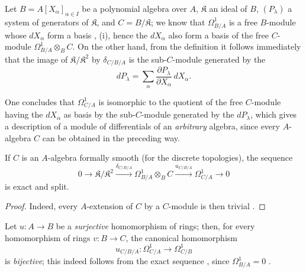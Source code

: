 \begin{example}[20.5.13]
\label{0.20.5.13}
Let $B=A[X_\alpha]_{\alpha\in I}$ be a polynomial algebra over $A$, $\mathfrak{K}$ an ideal of $B$, $(P_\lambda)$ a system of generators of $\mathfrak{K}$, and $C=B/\mathfrak{K}$; we know that $\Omega^1_{B/A}$ is a free $B$-module whose $dX_\alpha$ form a basis , (i), hence the $dX_\alpha$ also form a basis of the free $C$-module $\Omega^1_{B/A}\otimes_B C$.
On the other hand, from the definition it follows immediately that the image of $\mathfrak{K}/\mathfrak{K}^2$ by $\delta_{C/B/A}$ is the sub-$C$-module generated by the
\[
  dP_\lambda=\sum_\alpha\frac{\partial P_\lambda}{\partial X_\alpha}\,dX_\alpha.
\]

One concludes that $\Omega^1_{C/A}$ is isomorphic to the quotient of the free $C$-module having the $dX_\alpha$ as basis by the sub-$C$-module generated by the $dP_\lambda$, which gives a description of a module of differentials of an \emph{arbitrary} algebra, since every $A$-algebra $C$ can be obtained in the preceding way.
\end{example}

\begin{corollary}[20.5.14]
\label{0.20.5.14}
If $C$ is an $A$-algebra formally smooth \textup{(}for the discrete topologies\textup{)}, the sequence
\begin{equation}
\tag{20.5.14.1}
  \label{0.20.5.14.1}
  0\to\mathfrak{K}/\mathfrak{K}^2\xrightarrow{\delta_{C/B/A}}\Omega^1_{B/A}\otimes_B C\xrightarrow{u_{C/B/A}}\Omega^1_{C/A}\to 0
\end{equation}
is exact and split.
\end{corollary}

\begin{proof}
Indeed, every $A$-extension of $C$ by a $C$-module is then trivial .
\end{proof}

\begin{remark}[20.5.15]
\label{0.20.5.15}
Let $u:A\to B$ be a \emph{surjective} homomorphism of rings; then, for every homomorphism of rings $v:B\to C$, the canonical homomorphism
\begin{equation}
\tag{20.5.15.1}
  \label{0.20.5.15.1}
  u_{C/B/A}:\Omega^1_{C/A}\to\Omega^1_{C/B}
\end{equation}
is \emph{bijective}; this indeed follows from the exact sequence , since $\Omega^1_{B/A}=0$ .
\end{remark}


